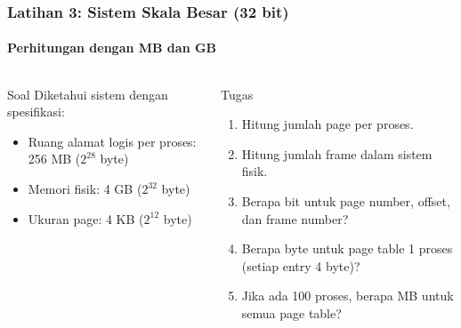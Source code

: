 \documentclass[t,aspectratio=169,xcolor=dvipsnames]{beamer}
\begin{document}
\begin{frame}
    \frametitle{Latihan 3: Sistem Skala Besar (32 bit)}
    \framesubtitle{Perhitungan dengan MB dan GB}
    \scriptsize

    \begin{columns}[T]
        \begin{block}{Soal}
            Diketahui sistem dengan spesifikasi:
            \begin{itemize}
                \item Ruang alamat logis per proses: 256 MB ($2^{28}$ byte)
                \item Memori fisik: 4 GB ($2^{32}$ byte)
                \item Ukuran page: 4 KB ($2^{12}$ byte)
            \end{itemize}
        \end{block}

        \begin{alertblock}{Tugas}
            \begin{enumerate}
                \item Hitung jumlah page per proses.
                \item Hitung jumlah frame dalam sistem fisik.
                \item Berapa bit untuk page number, offset, dan frame number?
                \item Berapa byte untuk page table 1 proses (setiap entry 4 byte)?
                \item Jika ada 100 proses, berapa MB untuk semua page table?
            \end{enumerate}
        \end{alertblock}
    \end{columns}
\end{frame}
\end{document}
